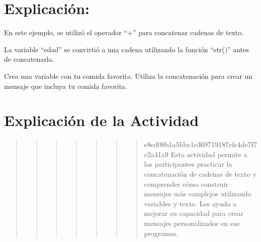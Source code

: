 \documentclass[
  a4paper,
  DIV=11,
  numbers=noendperiod,
  onepage,
  openany]{scrreprt}
\begin{document}
\hypertarget{explicaciuxf3n-15}{%
\section{Explicación:}\label{explicaciuxf3n-15}}

En este ejemplo, se utilizó el operador ``+'' para concatenar cadenas de
texto.

La variable ``edad'' se convirtió a una cadena utilizando la función
``str()'' antes de concatenarla.

\begin{tcolorbox}[enhanced jigsaw, colbacktitle=quarto-callout-important-color!10!white, toprule=.15mm, leftrule=.75mm, titlerule=0mm, opacityback=0, rightrule=.15mm, opacitybacktitle=0.6, breakable, left=2mm, coltitle=black, title=\textcolor{quarto-callout-important-color}{\faExclamation}\hspace{0.5em}{Actividad Práctica:}, toptitle=1mm, bottomtitle=1mm, arc=.35mm, bottomrule=.15mm, colback=white, colframe=quarto-callout-important-color-frame]

Crea una variable con tu comida favorita. Utiliza la concatenación para
crear un mensaje que incluya tu comida favorita.

\end{tcolorbox}

\hypertarget{explicaciuxf3n-de-la-actividad-13}{%
\section{Explicación de la
Actividad}\label{explicaciuxf3n-de-la-actividad-13}}

\begin{quote}
\begin{quote}
\begin{quote}
\begin{quote}
\begin{quote}
\begin{quote}
\begin{quote}
e8ed08b1a5bbe1e369719187cfc4de7f7e2a41a9 Esta actividad permite a los
participantes practicar la concatenación de cadenas de texto y
comprender cómo construir mensajes más complejos utilizando variables y
texto. Les ayuda a mejorar su capacidad para crear mensajes
personalizados en sus programas.
\end{quote}
\end{quote}
\end{quote}
\end{quote}
\end{quote}
\end{quote}
\end{quote}
\end{document}
